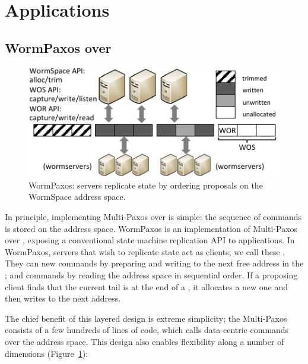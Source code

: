 \section{\sysname{} Applications}



\subsection{WormPaxos over \sysname{}}

\begin{figure}
\centering
\includegraphics[page=2]{pics/pics-small.pdf}
\caption{WormPaxos: servers replicate state by ordering proposals on the WormSpace address space.\label{fig:paxosarch}}
\vspace{-0.1in}
\end{figure}

In principle, implementing Multi-Paxos over \sysname{} is simple: the sequence of commands is stored on the \sysname{} address space. WormPaxos is an implementation of Multi-Paxos over \sysname{}, exposing a conventional state machine replication API to applications. In WormPaxos, servers that wish to replicate state act as \sysname{} clients; we call these \WPservers{}. They can  new commands by preparing and writing to the next free address in the \sysname{}; and  commands by reading the address space in sequential order. If a proposing client finds that the current tail is at the end of a \WOS{}, it allocates a new one and then writes to the next address.

The chief benefit of this layered design is extreme simplicity; the Multi-Paxos consists of a few hundreds of lines of code, which calls data-centric commands over the \sysname{} address space. This design also enables flexibility along a number of dimensions (Figure~\ref{fig:paxosarch}):


